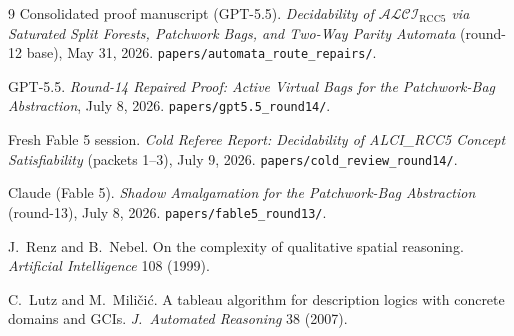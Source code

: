 \documentclass[11pt]{article}
\theoremstyle{definition}
\newcommand{\code}[1]{\texttt{#1}}
\begin{document}
\begin{thebibliography}{9}
 Consolidated proof manuscript (GPT-5.5).
\emph{Decidability of $\mathcal{ALCI}_{\mathrm{RCC5}}$ via Saturated
Split Forests, Patchwork Bags, and Two-Way Parity Automata} (round-12
base), May 31, 2026.
\code{papers/automata\_route\_repairs/}.

 GPT-5.5.  \emph{Round-14 Repaired Proof: Active
Virtual Bags for the Patchwork-Bag Abstraction}, July 8, 2026.
\code{papers/gpt5.5\_round14/}.

 Fresh Fable 5 session.  \emph{Cold Referee Report:
Decidability of ALCI\_RCC5 Concept Satisfiability} (packets 1--3),
July 9, 2026.  \code{papers/cold\_review\_round14/}.

 Claude (Fable 5).  \emph{Shadow Amalgamation for the
Patchwork-Bag Abstraction} (round-13), July 8, 2026.
\code{papers/fable5\_round13/}.

 J.~Renz and B.~Nebel.  On the complexity of
qualitative spatial reasoning.  \emph{Artificial Intelligence} 108
(1999).

 C.~Lutz and M.~Mili\v{c}i\'c.  A tableau
algorithm for description logics with concrete domains and GCIs.
\emph{J.~Automated Reasoning} 38 (2007).
\end{thebibliography}
\end{document}
